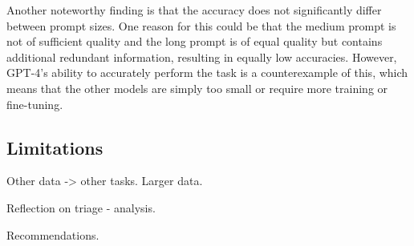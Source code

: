 Another noteworthy finding is that the accuracy does not significantly differ between prompt sizes.
One reason for this could be that the medium prompt is not of sufficient quality and the long prompt is of equal quality
but contains additional redundant information, resulting in equally low accuracies.
However, GPT-4's ability to accurately perform the task is a counterexample of this, which means that the other models
are simply too small or require more training or fine-tuning.

\subsection{Limitations}
\label{subsec:limitations}

Other data -> other tasks.
Larger data.

Reflection on triage - analysis.

Recommendations.